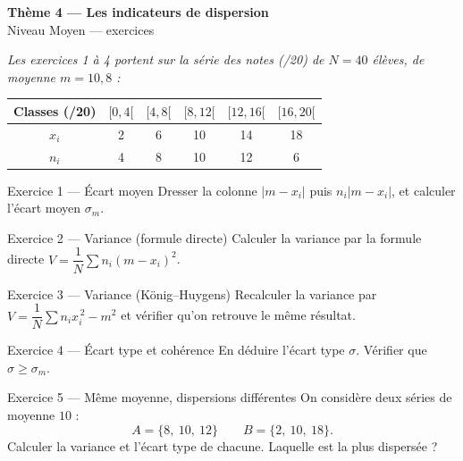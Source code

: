 \documentclass[11pt,a4paper]{article}
\newcommand{\bandeau}[2]{%
\begin{tcolorbox}[boxbase,colback=primary,colframe=primarydark,halign=center,
   before skip=2pt,after skip=12pt]
{\LARGE\bfseries\color{white} #1}\\[3pt]{\normalsize\color{white} #2}
\end{tcolorbox}}
\newcommand{\ecm}{\sigma_m}
\newcommand{\ect}{\sigma}
\begin{document}
\bandeau{Thème 4 — Les indicateurs de dispersion}{Niveau Moyen — exercices}

\noindent\textit{Les exercices 1 à 4 portent sur la série des notes (/20) de $N=40$ élèves, de
moyenne $m=10{,}8$ :}
\begin{center}
\renewcommand{\arraystretch}{1.15}
\begin{tabular}{|c|c|c|c|c|c|}
\hline
Classes (/20) & $[0,4[$ & $[4,8[$ & $[8,12[$ & $[12,16[$ & $[16,20[$ \\\hline
$x_i$ & 2 & 6 & 10 & 14 & 18 \\\hline
$n_i$ & 4 & 8 & 10 & 12 & 6 \\\hline
\end{tabular}
\end{center}

\begin{exobox}{Exercice 1 — Écart moyen}
Dresser la colonne $|m-x_i|$ puis $n_i|m-x_i|$, et calculer l'écart moyen $\ecm$.
\end{exobox}

\begin{exobox}{Exercice 2 — Variance (formule directe)}
Calculer la variance par la formule directe $V=\dfrac{1}{N}\sum n_i(m-x_i)^2$.
\end{exobox}

\begin{exobox}{Exercice 3 — Variance (König--Huygens)}
Recalculer la variance par $V=\dfrac{1}{N}\sum n_i x_i^{\,2}-m^2$ et vérifier qu'on retrouve le même
résultat.
\end{exobox}

\begin{exobox}{Exercice 4 — Écart type et cohérence}
En déduire l'écart type $\ect$. Vérifier que $\ect\geqslant\ecm$.
\end{exobox}

\begin{exobox}{Exercice 5 — Même moyenne, dispersions différentes}
On considère deux séries de moyenne $10$ :
\[ A=\{8,\ 10,\ 12\}\qquad B=\{2,\ 10,\ 18\}. \]
Calculer la variance et l'écart type de chacune. Laquelle est la plus dispersée ?
\end{exobox}
\end{document}
